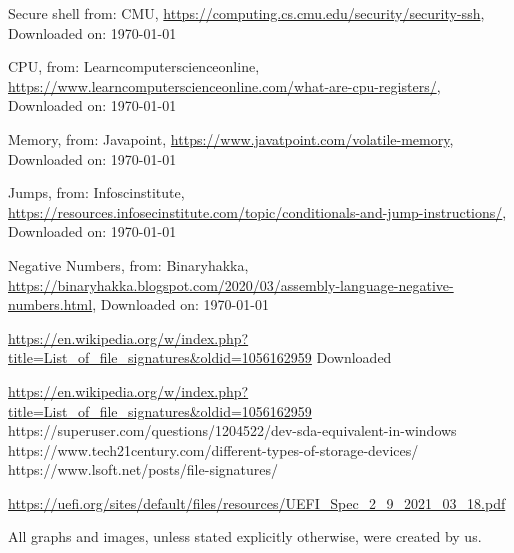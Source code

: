 \begin{thebibliography}{10}
	Secure shell from: CMU,
	\url{https://computing.cs.cmu.edu/security/security-ssh},
	Downloaded on: \today

	CPU, from: Learncomputerscienceonline,
	\url{https://www.learncomputerscienceonline.com/what-are-cpu-registers/},
	Downloaded on: \today

	Memory, from: Javapoint,
	\url{https://www.javatpoint.com/volatile-memory},
	Downloaded on: \today

	Jumps, from: Infoscinstitute,
	\url{https://resources.infosecinstitute.com/topic/conditionals-and-jump-instructions/},
	Downloaded on: \today

	Negative Numbers, from: Binaryhakka,
	\url{https://binaryhakka.blogspot.com/2020/03/assembly-language-negative-numbers.html},
	Downloaded on: \today

\bibitem{}

	\url{https://en.wikipedia.org/w/index.php?title=List\_of\_file\_signatures&oldid=1056162959}
	Downloaded
\end{thebibliography}


\url{https://en.wikipedia.org/w/index.php?title=List\_of\_file\_signatures&oldid=1056162959}
https://superuser.com/questions/1204522/dev-sda-equivalent-in-windows
https://www.tech21century.com/different-types-of-storage-devices/
https://www.lsoft.net/posts/file-signatures/

\url{https://uefi.org/sites/default/files/resources/UEFI\_Spec\_2\_9\_2021\_03\_18.pdf}

%
All graphs and images, unless stated explicitly otherwise, were created by us. 
